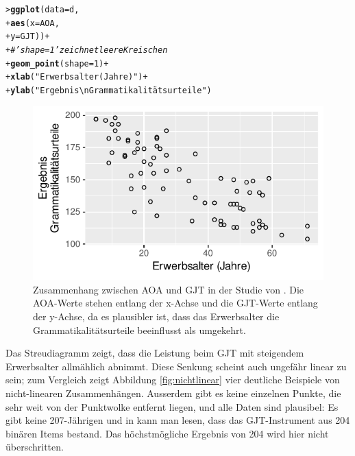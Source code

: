\documentclass[oneside, 10pt]{book}\usepackage[]{graphicx}\usepackage[]{xcolor}
\makeatletter
\newcommand{\hlnum}[1]{\textcolor[rgb]{0.686,0.059,0.569}{#1}}%
\newcommand{\hlstr}[1]{\textcolor[rgb]{0.192,0.494,0.8}{#1}}%
\newcommand{\hlcom}[1]{\textcolor[rgb]{0.678,0.584,0.686}{\textit{#1}}}%
\newcommand{\hlopt}[1]{\textcolor[rgb]{0,0,0}{#1}}%
\newcommand{\hlstd}[1]{\textcolor[rgb]{0.345,0.345,0.345}{#1}}%
\newcommand{\hlkwc}[1]{\textcolor[rgb]{0.333,0.667,0.333}{#1}}%
\newcommand{\hlkwd}[1]{\textcolor[rgb]{0.737,0.353,0.396}{\textbf{#1}}}%
\newenvironment{kframe}{%
 \def\at@end@of@kframe{}%
 \ifinner\ifhmode%
  \def\at@end@of@kframe{\end{minipage}}%
  \begin{minipage}{\columnwidth}%
 \fi\fi%
 \def\FrameCommand##1{\hskip\@totalleftmargin \hskip-\fboxsep
 \colorbox{shadecolor}{##1}\hskip-\fboxsep
     \hskip-\linewidth \hskip-\@totalleftmargin \hskip\columnwidth}%
 \MakeFramed {\advance\hsize-\width
   \@totalleftmargin\z@ \linewidth\hsize
   \@setminipage}}%
 {\par\unskip\endMakeFramed%
 \at@end@of@kframe}
\newenvironment{knitrout}{}{} %
\makeatother
\begin{document}
\begin{knitrout}
\color{fgcolor}\begin{kframe}
\begin{alltt}
\hlstd{> }\hlkwd{ggplot}\hlstd{(}\hlkwc{data} \hlstd{= d,}
\hlstd{+ }       \hlkwd{aes}\hlstd{(}\hlkwc{x} \hlstd{= AOA,}
\hlstd{+ }           \hlkwc{y} \hlstd{= GJT))} \hlopt{+}
\hlstd{+ }  \hlcom{# 'shape = 1' zeichnet leere Kreischen}
\hlstd{+ }  \hlkwd{geom_point}\hlstd{(}\hlkwc{shape} \hlstd{=} \hlnum{1}\hlstd{)} \hlopt{+}
\hlstd{+ }  \hlkwd{xlab}\hlstd{(}\hlstr{"Erwerbsalter (Jahre)"}\hlstd{)} \hlopt{+}
\hlstd{+ }  \hlkwd{ylab}\hlstd{(}\hlstr{"Ergebnis\textbackslash{}nGrammatikalitätsurteile"}\hlstd{)}
\end{alltt}
\end{kframe}\begin{figure}[tp]

{\centering \includegraphics[width=.7\textwidth]{figs/unnamed-chunk-177-1} 

}

\caption{Zusammenhang zwischen AOA und GJT in der Studie von \citet{DeKeyser2010}. Die AOA-Werte stehen entlang der x-Achse und die GJT-Werte entlang der y-Achse, da es plausibler ist, dass das Erwerbsalter die Grammatikalitätsurteile beeinflusst als umgekehrt.\label{fig:dekeyser}}\label{fig:unnamed-chunk-177}
\end{figure}

\end{knitrout}

Das Streudiagramm zeigt, dass die Leistung beim
GJT mit steigendem Erwerbsalter allmählich abnimmt.
Diese Senkung scheint auch ungefähr linear zu sein;
zum Vergleich zeigt Abbildung \ref{fig:nichtlinear} vier
deutliche Beispiele von nicht-linearen Zusammenhängen.
Ausserdem gibt es keine einzelnen
Punkte, die sehr weit von der Punktwolke entfernt liegen,
und alle Daten sind plausibel: Es gibt keine 207-Jährigen
und in \citet{DeKeyser2010} kann man lesen, dass
das GJT-Instrument aus 204 binären Items bestand.
Das höchstmögliche Ergebnis von 204 wird hier nicht überschritten.
\end{document}
